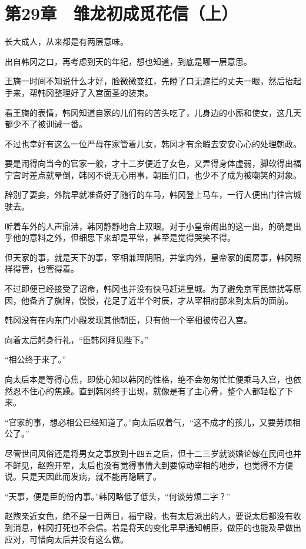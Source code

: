 \section{第29章　雏龙初成觅花信（上）}

长大成人，从来都是有两层意味。

出自韩冈之口，再考虑到天的年纪，想也知道，到底是哪一层意思。

王旖一时间不知说什么才好，脸微微变红，先瞪了口无遮拦的丈夫一眼，然后抬起手来，帮韩冈整理好了入宫面圣的装束。

看王旖的表情，韩冈知道自家的儿们有的苦头吃了，儿身边的小厮和使女，这几天都少不了被训诫一番。

不过也幸好有这么一位严母在家管着儿女，韩冈才有余暇去安安心心的处理朝政。

要是闹得向当今的官家一般，才十二岁便近了女色，又弄得身体虚弱，脚软得出福宁宫时差点就晕倒，韩冈不说无心用事，朝臣们口，也少不了成为被嘲笑的对象。

辞别了妻妾，外院早就准备好了随行的车马，韩冈登上马车，一行人便出门往宫城驶去。

听着车外的人声鼎沸，韩冈静静地合上双眼。对于小皇帝闹出的这一出，的确是出乎他的意料之外，但细思下来却是平常，甚至是觉得哭笑不得。

但天家的事，就是天下的事，宰相兼理阴阳，并掌内外，皇帝家的闺房事，韩冈照样得管，也管得着。

不过即便已经接受了诏命，韩冈也并没有快马赶进皇城。为了避免京军民惊扰等原因，他备齐了旗牌，慢慢，花足了近半个时辰，才从宰相府邸来到太后的面前。

韩冈没有在内东门小殿发现其他朝臣，只有他一个宰相被传召入宫。

向着太后躬身行礼，“臣韩冈拜见陛下。”

“相公终于来了。”

向太后本是等得心焦，即使心知以韩冈的性格，绝不会匆匆忙忙便乘马入宫，也依然忍不住心的焦躁。直到韩冈终于出现，就像是有了主心骨，整个人都轻松了下来。

“官家的事，想必相公已经知道了。”向太后叹着气，“这不成才的孩儿，又要劳烦相公了。”

尽管世间风俗还是将男女之事放到十四五之后，但十二三岁就谈婚论嫁在民间也并不鲜见，赵煦开荤，太后也没有觉得事情大到要惊动宰相的地步，也觉得不方便说。只是天因此而发病，就不能再隐瞒了。

“天事，便是臣的份内事。”韩冈略低了低头，“何谈劳烦二字？”

赵煦亲近女色，绝不是一日两日，福宁殿，也有太后派出的人，要说太后都没有收到消息，韩冈打死也不会信。若是将天的变化早早通知朝臣，做臣的也能及早做出应对，可惜向太后并没有这么做。

